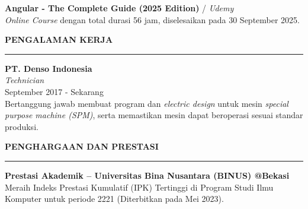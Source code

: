 \documentclass[12pt,a4paper]{article}
\begin{document}
\textbf{Angular - The Complete Guide (2025 Edition)} / \textit{Udemy} \\
\textit{Online Course} dengan total durasi 56 jam, diselesaikan pada 30 September 2025.

\vspace{2cm}

\vspace{0.5cm}
\textbf{PENGALAMAN KERJA}
\vspace{0.2cm}
\hrule
\vspace{0.4cm}

\textbf{PT. Denso Indonesia} \\
\textit{Technician} \\
September 2017 - Sekarang \\
Bertanggung jawab membuat program dan \textit{electric design} untuk mesin \textit{special purpose machine (SPM)}, serta memastikan mesin dapat beroperasi sesuai standar produksi.
\vspace{0.3cm}

\vspace{0.5cm}
\textbf{PENGHARGAAN DAN PRESTASI}
\vspace{0.2cm}
\hrule
\vspace{0.4cm}

\textbf{Prestasi Akademik – Universitas Bina Nusantara (BINUS) @Bekasi} \\
Meraih Indeks Prestasi Kumulatif (IPK) Tertinggi di Program Studi Ilmu Komputer untuk periode 2221 (Diterbitkan pada Mei 2023).
\end{document}

